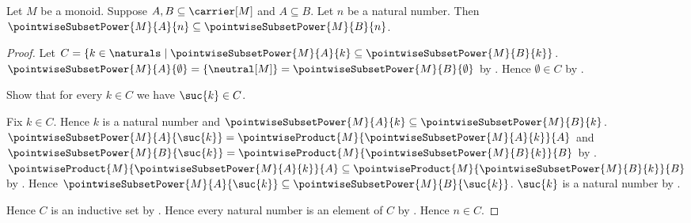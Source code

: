 \begin{theorem}\label{pointwise_subset_power_monotone}
    Let $M$ be a monoid.
    Suppose $A,B\subseteq\carrier[M]$ and $A\subseteq B$.
    Let $n$ be a natural number.
    Then $\pointwiseSubsetPower{M}{A}{n}
        \subseteq\pointwiseSubsetPower{M}{B}{n}$.
\end{theorem}
\begin{proof}
    Let $C=\{k\in\naturals\mid
        \pointwiseSubsetPower{M}{A}{k}
            \subseteq\pointwiseSubsetPower{M}{B}{k}\}$.
    $\pointwiseSubsetPower{M}{A}{\emptyset}
        =\{\neutral[M]\}
        =\pointwiseSubsetPower{M}{B}{\emptyset}$ by
        .
    Hence $\emptyset\in C$ by .

    Show that for every $k\in C$ we have $\suc{k}\in C$.
    \begin{subproof}
        Fix $k\in C$.
        Hence $k$ is a natural number and
            $\pointwiseSubsetPower{M}{A}{k}
                \subseteq\pointwiseSubsetPower{M}{B}{k}$.
        $\pointwiseSubsetPower{M}{A}{\suc{k}}
            =\pointwiseProduct{M}{\pointwiseSubsetPower{M}{A}{k}}{A}$
            and
        $\pointwiseSubsetPower{M}{B}{\suc{k}}
            =\pointwiseProduct{M}{\pointwiseSubsetPower{M}{B}{k}}{B}$ by
            .
        $\pointwiseProduct{M}{\pointwiseSubsetPower{M}{A}{k}}{A}
            \subseteq
            \pointwiseProduct{M}{\pointwiseSubsetPower{M}{B}{k}}{B}$ by
            .
        Hence $\pointwiseSubsetPower{M}{A}{\suc{k}}
            \subseteq\pointwiseSubsetPower{M}{B}{\suc{k}}$.
        $\suc{k}$ is a natural number by .
    \end{subproof}
    Hence $C$ is an inductive set by .
    Hence every natural number is an element of $C$ by
        .
    Hence $n\in C$.
\end{proof}

